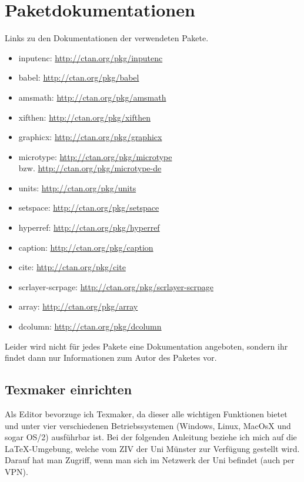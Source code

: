 \label{anhang}

\section{Paketdokumentationen}

Links zu den Dokumentationen der verwendeten Pakete.

\begin{itemize}
    \item inputenc: \url{http://ctan.org/pkg/inputenc}
    \item babel: \url{http://ctan.org/pkg/babel}
    \item amsmath: \url{http://ctan.org/pkg/amsmath}
    \item xifthen: \url{http://ctan.org/pkg/xifthen}
    \item graphicx: \url{http://ctan.org/pkg/graphicx}
    \item microtype: \url{http://ctan.org/pkg/microtype} \\
	    bzw. \url{http://ctan.org/pkg/microtype-de}
    \item units: \url{http://ctan.org/pkg/units}
    \item setspace: \url{http://ctan.org/pkg/setspace}
    \item hyperref: \url{http://ctan.org/pkg/hyperref}
    \item caption: \url{http://ctan.org/pkg/caption}
    \item cite: \url{http://ctan.org/pkg/cite}
    \item scrlayer-scrpage: \url{http://ctan.org/pkg/scrlayer-scrpage}
    \item array: \url{http://ctan.org/pkg/array}
    \item dcolumn: \url{http://ctan.org/pkg/dcolumn}
\end{itemize}

Leider wird nicht für jedes Pakete eine Dokumentation angeboten, sondern ihr findet dann nur Informationen zum Autor des Paketes vor.

\clearpage

\subsection{Texmaker einrichten}\label{sec:texmaker}

Als Editor bevorzuge ich Texmaker, da dieser alle wichtigen Funktionen bietet und unter vier verschiedenen Betriebssystemen (Windows, Linux, MacOsX und sogar OS/2) ausführbar ist. Bei der folgenden Anleitung beziehe ich mich auf die \LaTeX-Umgebung, welche vom ZIV der Uni Münster zur Verfügung gestellt wird. Darauf hat man Zugriff, wenn man sich im Netzwerk der Uni befindet (auch per VPN).


